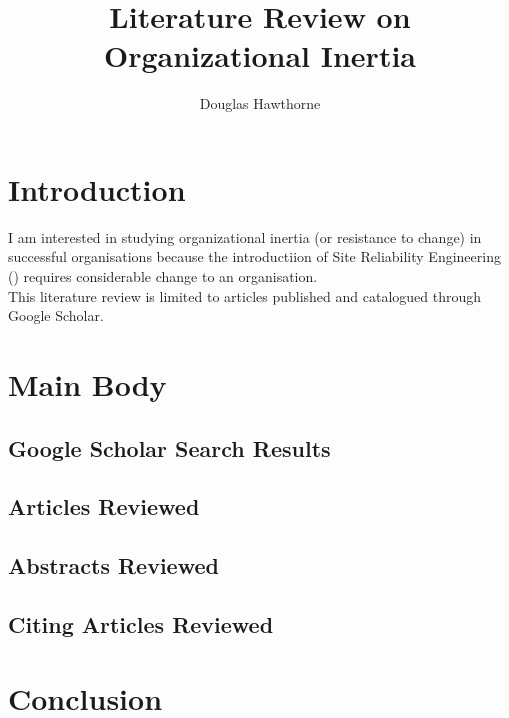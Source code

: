 \documentclass[]{report}
\title{Literature Review on Organizational Inertia}
\author{Douglas Hawthorne}
\begin{document}
\maketitle

\begin{abstract}
\end{abstract}

\tableofcontents

\chapter{Introduction}
I am interested in studying organizational inertia (or resistance to change) in successful organisations because the introductiion of Site Reliability Engineering (\cite{beyer2016site}) requires considerable change to an organisation.\\

This literature review is limited to articles published and catalogued through Google Scholar.\\

\chapter{Main Body}
\section{Google Scholar Search Results}

\section{Articles Reviewed}

\section{Abstracts Reviewed}
\section{Citing Articles Reviewed}


\chapter{Conclusion}


\end{document}
